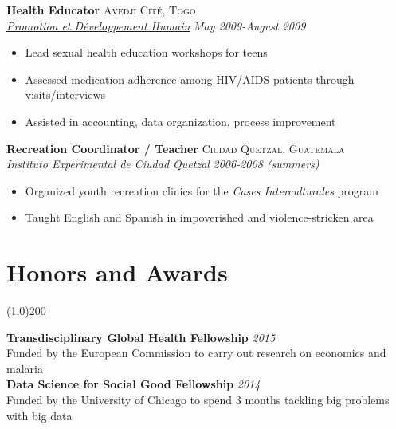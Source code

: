 \documentclass[11pt]{article}
\begin{document}
\noindent \textbf{Health Educator} \hfill \textsc{Avedji Cité, Togo}\\
\noindent \emph{\href{http://www.pdh-togo.org/html/english/welcome.html}{Promotion et Développement Humain}} \hfill \emph{May 2009-August 2009}
\vspace{-2mm}
\begin{itemize}\itemsep0pt \parskip0pt 
\item Lead sexual health education workshops for teens
\item Assessed medication adherence among HIV/AIDS patients through visits/interviews
\item Assisted in accounting, data organization, process improvement

\end{itemize}

\noindent \textbf{Recreation Coordinator / Teacher} \hfill \textsc{Ciudad Quetzal, Guatemala}\\
\noindent \emph{Instituto Experimental de Ciudad Quetzal} \hfill \emph{2006-2008 (summers)}
\vspace{-2mm}
\begin{itemize}\itemsep0pt \parskip0pt 
\item Organized youth recreation clinics for the \textit{Cases Interculturales} program
\item Taught English and Spanish in impoverished and violence-stricken area
\end{itemize}


\newpage



\section*{Honors and Awards} %
\vspace{-7mm}
\line(1,0){200}
\vspace{2mm}

\noindent \textbf{Transdisciplinary Global Health Fellowship} \hfill \emph{2015}\\
\noindent Funded by the European Commission to carry out research on economics and malaria \\


\noindent \textbf{Data Science for Social Good Fellowship} \hfill \emph{2014}\\
\noindent Funded by the University of Chicago to spend 3 months tackling big problems with big data \\
\end{document}

